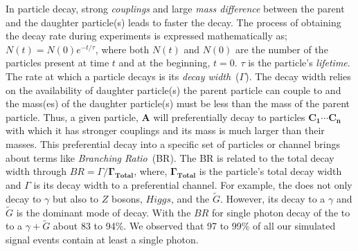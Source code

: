 {{%
In particle decay, strong \textit{couplings} and large \textit{mass difference} between the parent and the daughter particle(s) leads to faster the decay. The process of obtaining the decay rate during experiments is expressed mathematically as; $N(t) = N(0)e^{-t/\tau}$, where both $N(t)$ and $N(0)$ are the number of the particles present at time $t$ and at the beginning, $t=0$. $\tau$ is the particle's \textit{lifetime}.
\newline
The rate at which a particle decays is its \textit{decay width}~(\textbf{$\Gamma$}).
The decay width relies on the availability of daughter particle(s) the parent particle can couple to and the mass(es) of the
daughter particle(s) must be less than the mass of the parent particle. Thus, a given particle, $\mathbf{A}$
will preferentially decay to particles  $\mathbf{C_{1}}\cdots \mathbf{C_{n}}$ with which it has stronger couplings and its mass is much larger than their masses. This preferential decay into a specific set of particles or channel brings about terms like \textit{Branching Ratio}~(BR). The BR is related to the total decay width through $BR =\Gamma/ \mathbf{\Gamma_{Total}}$, where,  $\mathbf{\Gamma_{Total}}$ is the particle's total decay width and $\Gamma$ is its decay width to a preferential channel. For example, the \PSneutralinoOne does not only decay to $\gamma$ but also to $Z$ bosons, $Higgs$, \EE and the $\tilde{G}$. However, its decay to a $\gamma$ and $\tilde{G}$ is the dominant mode of decay. With the $BR$ for single photon decay of the \PSneutralinoOne to to a $\gamma + \tilde{G}$ about  83 to 94\%. We observed that 97 to 99\% of all our simulated signal events contain at least a single photon. 
}}
